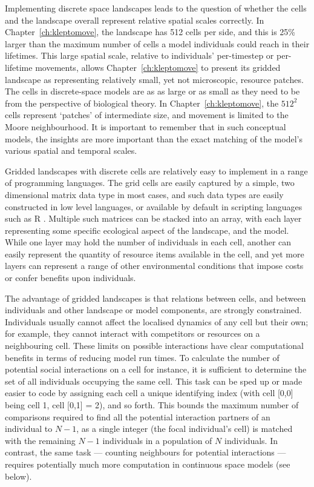 Implementing discrete space landscapes leads to the question of whether the cells and the landscape overall represent relative spatial scales correctly.
In Chapter~\ref{ch:kleptomove}, the landscape has 512 cells per side, and this is 25\% larger than the maximum number of cells a model individuals could reach in their lifetimes.
This large spatial scale, relative to individuals' per-timestep or per-lifetime movements, allows Chapter~\ref{ch:kleptomove} to present its gridded landscape as representing relatively small, yet not microscopic, resource patches.
The cells in discrete-space models are as as large or as small as they need to be from the perspective of biological theory.
In Chapter~\ref{ch:kleptomove}, the $512^2$ cells represent `patches' of intermediate size, and movement is limited to the Moore neighbourhood.
It is important to remember that in such conceptual models, the insights are more important than the exact matching of the model's various spatial and temporal scales.

Gridded landscapes with discrete cells are relatively easy to implement in a range of programming languages.
The grid cells are easily captured by a simple, two dimensional matrix data type in most cases, and such data types are easily constructed in low level languages, or available by default in scripting languages such as R \citep{rcoreteam2020}.
Multiple such matrices can be stacked into an array, with each layer representing some specific ecological aspect of the landscape, and the model.
While one layer may hold the number of individuals in each cell, another can easily represent the quantity of resource items available in the cell, and yet more layers can represent a range of other environmental conditions that impose costs or confer benefits upon individuals.

The advantage of gridded landscapes is that relations between cells, and between individuals and other landscape or model components, are strongly constrained.
Individuals usually cannot affect the localised dynamics of any cell but their own; for example, they cannot interact with competitors or resources on a neighbouring cell.
These limits on possible interactions have clear computational benefits in terms of reducing model run times.
To calculate the number of potential social interactions on a cell for instance, it is sufficient to determine the set of all individuals occupying the same cell.
This task can be sped up or made easier to code by assigning each cell a unique identifying index (with cell [0,0] being cell 1, cell [0,1] = 2), and so forth.
This bounds the maximum number of comparisons required to find all the potential interaction partners of an individual to $N - 1$, as a single integer (the focal individual's cell) is matched with the remaining $N - 1$ individuals in a population of $N$ individuals.
In contrast, the same task --- counting neighbours for potential interactions --- requires potentially much more computation in continuous space models (see below).

